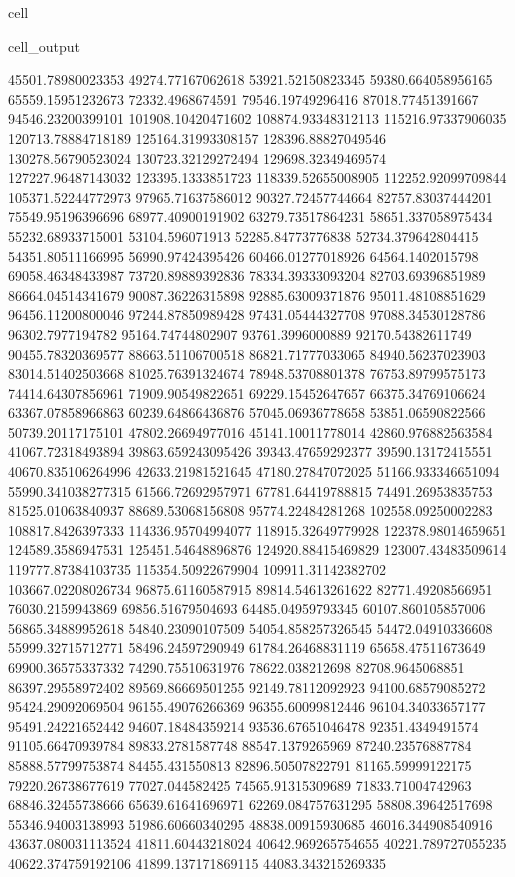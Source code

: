 \documentclass[letterpaper,10pt,english]{jupyterBook}
\begin{document}
\begin{sphinxuseclass}{cell}
\begin{sphinxVerbatimOutput}
\begin{sphinxuseclass}{cell_output}
\begin{sphinxVerbatim}[commandchars=\\\{\}]
45501.78980023353  49274.77167062618  53921.52150823345  59380.664058956165  65559.15951232673  72332.4968674591  79546.19749296416  87018.77451391667  94546.23200399101  101908.10420471602  108874.93348312113  115216.97337906035  120713.78884718189  125164.31993308157  128396.88827049546  130278.56790523024  130723.32129272494  129698.32349469574  127227.96487143032  123395.1333851723  118339.52655008905  112252.92099709844  105371.52244772973  97965.71637586012  90327.72457744664  82757.83037444201  75549.95196396696  68977.40900191902  63279.73517864231  58651.337058975434  55232.68933715001  53104.596071913  52285.84773776838  52734.379642804415  54351.80511166995  56990.97424395426  60466.01277018926  64564.1402015798  69058.46348433987  73720.89889392836  78334.39333093204  82703.69396851989  86664.04514341679  90087.36226315898  92885.63009371876  95011.48108851629  96456.11200800046  97244.87850989428  97431.05444327708  97088.34530128786  96302.7977194782  95164.74744802907  93761.3996000889  92170.54382611749  90455.78320369577  88663.51106700518  86821.71777033065  84940.56237023903  83014.51402503668  81025.76391324674  78948.53708801378  76753.89799575173  74414.64307856961  71909.90549822651  69229.15452647657  66375.34769106624  63367.07858966863  60239.64866436876  57045.06936778658  53851.06590822566  50739.20117175101  47802.26694977016  45141.10011778014  42860.976882563584  41067.72318493894  39863.659243095426  39343.47659292377  39590.13172415551  40670.835106264996  42633.21981521645  
47180.27847072025  51166.933346651094  55990.341038277315  61566.72692957971  67781.64419788815  74491.26953835753  81525.01063840937  88689.53068156808  95774.22484281268  102558.09250002283  108817.8426397333  114336.95704994077  118915.32649779928  122378.98014659651  124589.3586947531  125451.54648896876  124920.88415469829  123007.43483509614  119777.87384103735  115354.50922679904  109911.31142382702  103667.02208026734  96875.61160587915  89814.54613261622  82771.49208566951  76030.2159943869  69856.51679504693  64485.04959793345  60107.860105857006  56865.34889952618  54840.23090107509  54054.858257326545  54472.04910336608  55999.32715712771  58496.24597290949  61784.26468831119  65658.47511673649  69900.36575337332  74290.75510631976  78622.038212698  82708.9645068851  86397.29558972402  89569.86669501255  92149.78112092923  94100.68579085272  95424.29092069504  96155.49076266369  96355.60099812446  96104.34033657177  95491.24221652442  94607.18484359214  93536.67651046478  92351.4349491574  91105.66470939784  89833.2781587748  88547.1379265969  87240.23576887784  85888.57799753874  84455.431550813  82896.50507822791  81165.59999122175  79220.26738677619  77027.044582425  74565.91315309689  71833.71004742963  68846.32455738666  65639.61641696971  62269.084757631295  58808.39642517698  55346.94003138993  51986.60660340295  48838.00915930685  46016.344908540916  43637.080031113524  41811.60443218024  40642.969265754655  40221.789727055235  40622.374759192106  41899.137171869115  44083.343215269335  

\end{sphinxVerbatim}
\end{sphinxuseclass}
\end{sphinxVerbatimOutput}
\end{sphinxuseclass}
\end{document}
